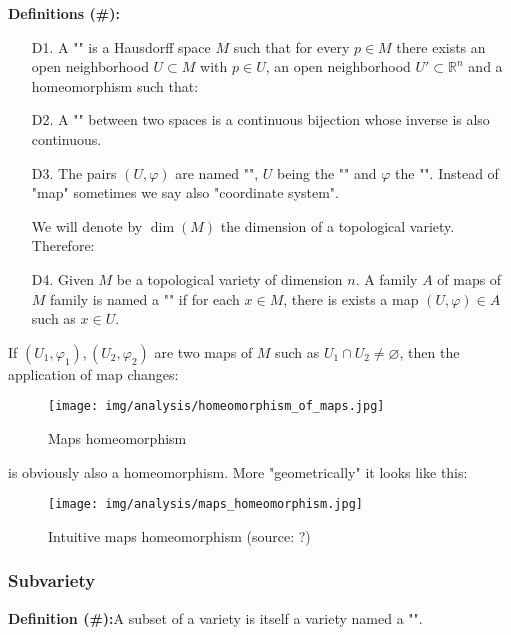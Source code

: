 	\textbf{Definitions (\#\mydef):}
	\begin{enumerate}
		\item[D1.] A "" is a Hausdorff space $M$ such that for every $p\in M$ there exists an open neighborhood $U\subset M$ with $p\in U$, an open neighborhood $U' \subset \mathbb{R}^n$ and a homeomorphism such that:
		
		\item[D2.] A "" between two spaces is a continuous bijection whose inverse is also continuous.

		\item[D3.] The pairs $(U,\varphi)$ are named "", $U$ being the "" and $\varphi$ the "". Instead of "map" sometimes we say also "coordinate system".

		\begin{tcolorbox}[title=Remark,colframe=black,arc=10pt]
		We will denote by $\dim(M)$ the dimension of a topological variety. Therefore:
		
		\end{tcolorbox}
	
		\item[D4.] Given $M$ be a topological variety of dimension $n$. A family $A$ of maps of $M$ family is named a  "" if for each $x\in M$, there is exists a map $(U, \varphi)\in A$ such as $x\in U$.
	\end{enumerate}
	If $(U_1,\varphi_1),(U_2,\varphi_2)$ are two maps of $M$ such as $U_1\cap U_2\neq \varnothing$, then the application of map changes:
	
	\begin{figure}[H]
		\centering
		\texttt{[image: img/analysis/homeomorphism\_of\_maps.jpg]}
		\caption{Maps homeomorphism}
	\end{figure}
	is obviously also a homeomorphism. More "geometrically" it looks like this:
	\begin{figure}[H]
		\centering
		\texttt{[image: img/analysis/maps\_homeomorphism.jpg]}
		\caption[Intuitive maps homeomorphism]{Intuitive maps homeomorphism (source: ?)}
	\end{figure}
	
	\pagebreak
	\subsubsection{Subvariety}
	\textbf{Definition (\#\mydef):}A subset of a variety is itself a variety named a "\label{subvariety}". 

